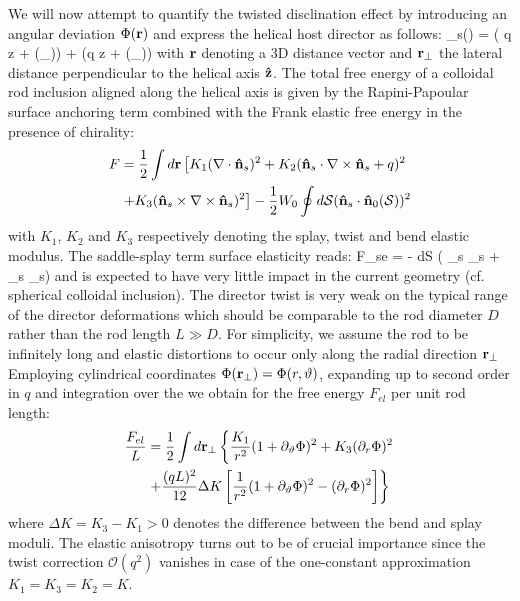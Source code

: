 We will now attempt to quantify the twisted disclination effect by introducing an angular deviation $\Phi({\bf r})$ and express the helical host director as follows:
\beq
\bn_{s}(\bfr) = \bx \cos( q z + \Phi(\bfr_{\perp}))  + \by \sin (q z + \Phi(\bfr_{\perp}))
\label{nsebluee}
\eeq
with ${\bf r}$ denoting a 3D distance vector and ${\bf r}_{\perp}$  the lateral distance perpendicular to the helical axis ${\bf \hat{z}}$.  The total free energy of a colloidal rod inclusion aligned along the helical axis is given by the Rapini-Papoular surface anchoring term  combined with the Frank elastic free energy in the presence of chirality:
\begin{align}
F &= \frac{1}{2} \int d {\bf r} \left [ K_{1} (\nabla \cdot {\bf \hat{n}}_{s})^{2}  + K_{2} ({\bf \hat{n}}_{s} \cdot \nabla \times {\bf \hat{n}}_{s} + q)^{2} \right . \nonumber \\
& \left . +   K_{3} ({\bf \hat{n}}_{s} \times \nabla \times {\bf \hat{n}}_{s})^{2} \right ]
-\frac{1}{2} W_{0} \oint d{\mathcal S}  ({\bf \hat{n}}_{s} \cdot {\bf \hat{n}}_{0}({\mathcal S}))^{2}
\end{align}
with $K_{1}$, $K_{2}$ and $K_{3}$ respectively denoting the splay, twist and bend elastic modulus.  The saddle-splay term surface elasticity reads:
\beq
F_{se} = - \oint d{\mathcal S} \cdot \left ( \bn_{s} \nabla \cdot \bn_{s} +  \bn_{s} \times \nabla \times \bn_{s}\right )
\eeq
and is expected to have very little impact in the current geometry (cf. spherical colloidal inclusion).
The director twist is very weak on the typical range of the director deformations which should be comparable to the rod diameter $D$ rather than the rod length $L \gg D$. For simplicity, we assume the rod to be infinitely long and elastic distortions to occur only along the radial direction ${\bf r}_{\perp}$ Employing cylindrical coordinates $\Phi({\bf r}_{\perp}) = \Phi (r, \vartheta ) $, expanding up to second order in $q$ and integration over the  we obtain for the  free energy  $ F_{el}$ per unit rod length:
\begin{align}
 \frac{F_{el}}{L} &=  \frac{1}{2} \int d  {\bf r}_{\perp} \left \{ \frac{K_{1}}{r^{2}} (1+ \partial_{\vartheta} \Phi)^{2} + K_{3} (\partial_{r} \Phi)^{2} \right . \nonumber \\
  & \left . + \frac{(qL)^{2}}{12} \Delta K  \left  [ \frac{1}{r^{2}} (1+ \partial_{\vartheta} \Phi)^{2} - (\partial_{r} \Phi)^{2} \right ] \right \}
  \label{felo}
  \end{align}
  where $\Delta K = K_{3} - K_{1} >0 $ denotes the difference between the bend and splay moduli. The elastic anisotropy turns out to be of crucial importance since the twist correction $\mathcal{O}(q^{2})$  vanishes in case of the one-constant approximation $K_{1} = K_{3} = K_{2} = K$.
